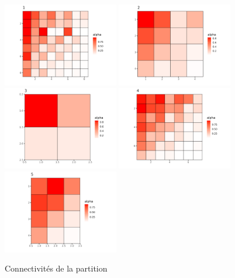 \documentclass{beamer}
\begin{document}
\begin{frame}
\begin{columns}
\begin{column}{0.48\linewidth}
\begin{figure}[H]
                \includegraphics[width=0.45\textwidth]{img/iid-meso-1.png}
                \includegraphics[width=0.45\textwidth]{img/iid-meso-2.png}
                \includegraphics[width=0.45\textwidth]{img/iid-meso-3.png}
                \includegraphics[width=0.45\textwidth]{img/iid-meso-4.png}
                \includegraphics[width=0.45\textwidth]{img/iid-meso-5.png}
                \caption{Connectivités de la partition}
            \end{figure}
        \end{column}
    \end{columns}
\end{frame}
\end{document}
